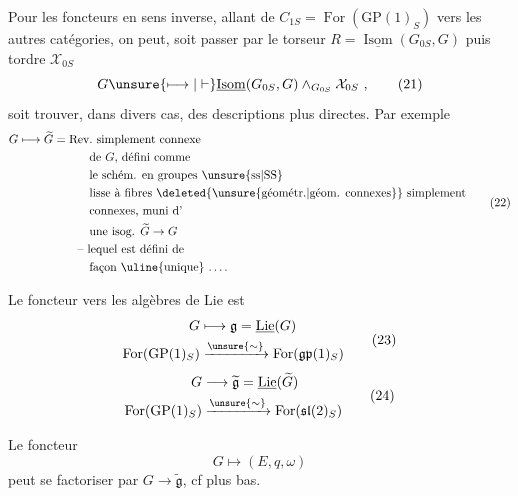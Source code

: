 Pour les foncteurs en sens inverse, allant de $C_{1S}=\operatorname{For}(\mathrm{GP}(1)_S)$ vers les autres catégories, on peut, soit passer par le torseur $R=\underline{\operatorname{Isom}}(G_{0S},G)$ puis tordre $\mathcal X_{0S}$
\[
G\unsure{\longmapsto|\vdash}\underline{\operatorname{Isom}}(G_{0S},G)\wedge_{G_{0S}}\mathcal X_{0S}\ ,\tag*{(21)}
\]
soit trouver, dans divers cas, des descriptions plus directes. Par exemple
\[
\begin{aligned}
G&\longmapsto\widetilde G=\text{Rev.\ simplement connexe}\\
 &\hspace{6em}\text{de $G$, défini comme}\\
 &\hspace{6em}\text{le schém. en groupes \unsure{ss|SS}}\\
 &\hspace{6em}\text{lisse à fibres \deleted{\unsure{géométr.|géom. connexes}} simplement}\\
 &\hspace{6em}\text{connexes, muni d'}\\
 &\hspace{6em}\text{une isog. $\widetilde G\to G$}\\
 &\hspace{5em}\text{-- lequel est défini de}\\
 &\hspace{6em}\text{façon \uline{unique} \ldots.}
\end{aligned}\tag*{(22)}
\]

Le foncteur vers les algèbres de Lie est
\[
\begin{aligned}
G&\longmapsto\mathfrak g=\underline{\operatorname{Lie}}(G)\\
\operatorname{For}(\mathrm{GP}(1)_S)&\xrightarrow{\unsure{\sim}}\operatorname{For}(\mathfrak{gp}(1)_S)
\end{aligned}\tag*{(23)}
\]
\[
\begin{aligned}
G&\longrightarrow\widetilde{\mathfrak g}=\underline{\operatorname{Lie}}(\widetilde G)\\
\operatorname{For}(\mathrm{GP}(1)_S)&\xrightarrow{\unsure{\sim}}\operatorname{For}(\mathfrak{sl}(2)_S)
\end{aligned}\tag*{(24)}
\]

Le foncteur
\[
G\longmapsto(E,q,\omega)
\]
peut se factoriser par $G\to\widetilde{\mathfrak g}$, cf plus bas.

